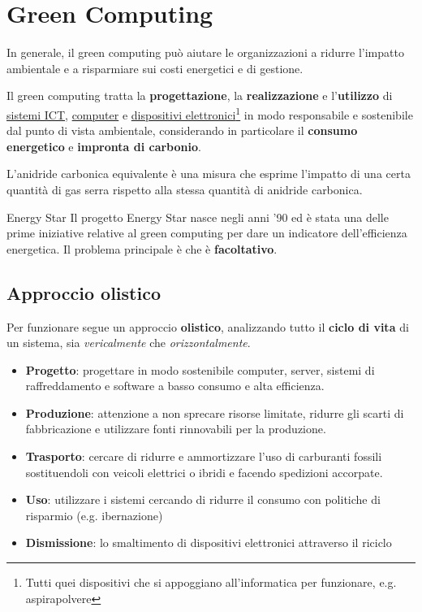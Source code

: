 \newpage
\section{Green Computing}
In generale, il green computing può aiutare le organizzazioni a ridurre l'impatto ambientale e a risparmiare sui costi energetici e di gestione.

\begin{definition}
	Il green computing tratta la \textbf{progettazione}, la \textbf{realizzazione} e l'\textbf{utilizzo} di \underline{sistemi ICT}, \underline{computer} e \underline{dispositivi elettronici}\footnote{Tutti quei dispositivi che si appoggiano all'informatica per funzionare, e.g. aspirapolvere} in modo responsabile e sostenibile dal punto di vista ambientale, considerando in particolare il \textbf{consumo energetico} e \textbf{impronta di carbonio}.
\end{definition}

\begin{definition}[$CO_2$-eq]
	L'anidride carbonica equivalente è una misura che esprime l'impatto di una certa quantità di gas serra rispetto alla stessa quantità di anidride carbonica.
\end{definition}

\begin{definition}{Energy Star}
	Il progetto Energy Star nasce negli anni '90 ed è stata una delle prime iniziative relative al green computing per dare un indicatore dell'efficienza energetica. Il problema principale è che è \textbf{facoltativo}.
\end{definition}

\subsection{Approccio olistico}
Per funzionare segue un approccio \textbf{olistico}, analizzando tutto il \textbf{ciclo di vita} di un sistema, sia \emph{vericalmente} che \emph{orizzontalmente}.

\begin{itemize}
	\item \textbf{Progetto}: progettare in modo sostenibile computer, server, sistemi di raffreddamento e software a basso consumo e alta efficienza.
	\item \textbf{Produzione}: attenzione a non sprecare risorse limitate, ridurre gli scarti di fabbricazione e utilizzare fonti rinnovabili per la produzione.
	\item \textbf{Trasporto}: cercare di ridurre e ammortizzare l'uso di carburanti fossili sostituendoli con veicoli elettrici o ibridi e facendo spedizioni accorpate.
	\item \textbf{Uso}: utilizzare i sistemi cercando di ridurre il consumo con politiche di risparmio (e.g. ibernazione)
	\item \textbf{Dismissione}: lo smaltimento di dispositivi elettronici attraverso il riciclo
\end{itemize}


